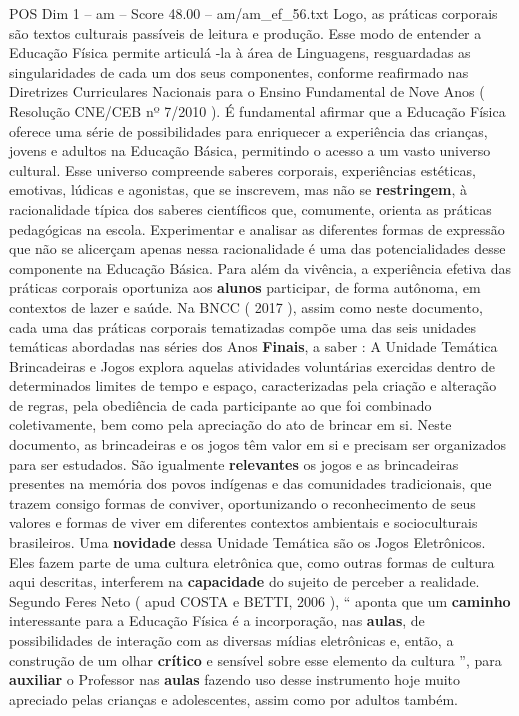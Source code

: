 \begin{textsample}{POS Dim 1 – am – Score 48.00 – am/am\_ef\_56.txt}
Logo, as práticas corporais são textos culturais passíveis de leitura e produção.
Esse modo de entender a Educação Física permite articulá -la à área de Linguagens, resguardadas as singularidades de cada um dos seus componentes, conforme reafirmado nas Diretrizes Curriculares Nacionais para o Ensino Fundamental de Nove Anos ( Resolução CNE/CEB nº 7/2010 ).
É fundamental afirmar que a Educação Física oferece uma série de possibilidades para enriquecer a experiência das crianças, jovens e adultos na Educação Básica, permitindo o acesso a um vasto universo cultural.
Esse universo compreende saberes corporais, experiências estéticas, emotivas, lúdicas e agonistas, que se inscrevem, mas não se \textbf{restringem}, à racionalidade típica dos saberes científicos que, comumente, orienta as práticas pedagógicas na escola.
Experimentar e analisar as diferentes formas de expressão que não se alicerçam apenas nessa racionalidade é uma das potencialidades desse componente na Educação Básica.
Para além da vivência, a experiência efetiva das práticas corporais oportuniza aos \textbf{alunos} participar, de forma autônoma, em contextos de lazer e saúde.
Na BNCC ( 2017 ), assim como neste documento, cada uma das práticas corporais tematizadas compõe uma das seis unidades temáticas abordadas nas séries dos Anos \textbf{Finais}, a saber : A Unidade Temática Brincadeiras e Jogos explora aquelas atividades voluntárias exercidas dentro de determinados limites de tempo e espaço, caracterizadas pela criação e alteração de regras, pela obediência de cada participante ao que foi combinado coletivamente, bem como pela apreciação do ato de brincar em si.
Neste documento, as brincadeiras e os jogos têm valor em si e precisam ser organizados para ser estudados.
São igualmente \textbf{relevantes} os jogos e as brincadeiras presentes na memória dos povos indígenas e das comunidades tradicionais, que trazem consigo formas de conviver, oportunizando o reconhecimento de seus valores e formas de viver em diferentes contextos ambientais e socioculturais brasileiros.
Uma \textbf{novidade} dessa Unidade Temática são os Jogos Eletrônicos.
Eles fazem parte de uma cultura eletrônica que, como outras formas de cultura aqui descritas, interferem na \textbf{capacidade} do sujeito de perceber a realidade.
Segundo Feres Neto ( apud COSTA e BETTI, 2006 ), “ aponta que um \textbf{caminho} interessante para a Educação Física é a incorporação, nas \textbf{aulas}, de possibilidades de interação com as diversas mídias eletrônicas e, então, a construção de um olhar \textbf{crítico} e sensível sobre esse elemento da cultura ”, para \textbf{auxiliar} o Professor nas \textbf{aulas} fazendo uso desse instrumento hoje muito apreciado pelas crianças e adolescentes, assim como por adultos também.

\end{textsample}
